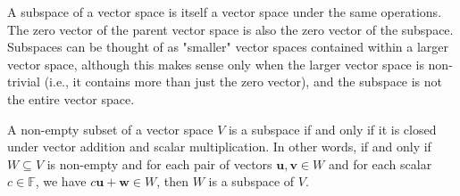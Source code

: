 \documentclass[openany]{book}
\begin{document}
\begin{mynote}
A subspace of a vector space is itself a vector space under the same operations. The zero vector of the parent vector space is also the zero vector of the subspace. \\
Subspaces can be thought of as "smaller" vector spaces contained within a larger vector space, although this makes sense only when the larger vector space is non-trivial (i.e., it contains more than just the zero vector), and the subspace is not the entire vector space.
\end{mynote}
\begin{mytheorem}
    A non-empty subset of a vector space $V$ is a subspace if and only if it is closed under vector addition and scalar multiplication. In other words, if and only if $W \subseteq V$ is non-empty and for each pair of vectors $\mathbf{u}, \mathbf{v} \in W$ and for each scalar $c \in \mathbb{F}$, we have $c\mathbf{u} + \mathbf{w} \in W$, then $W$ is a subspace of $V$.
\end{mytheorem}
\end{document}
